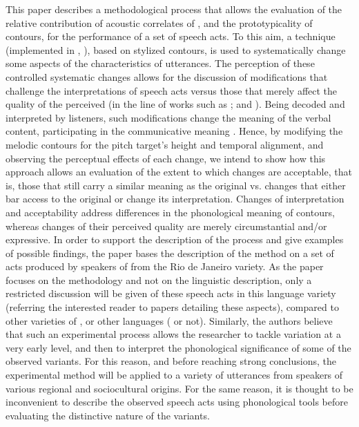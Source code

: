 \documentclass[output=paper]{LSP/langsci}
\begin{document}
This paper describes a methodological process that allows the evaluation of the relative contribution of acoustic correlates of , and the prototypicality of  contours, for the performance of a set of speech acts. 
To this aim, a  technique (implemented in , \citealt{Boersma.praat}), based on stylized contours, is used to systematically change some aspects of the  characteristics of utterances. 
The perception of these controlled systematic changes allows for the discussion of modifications that challenge the interpretations of speech acts versus those that merely affect the quality of the perceived  (in the line of works such as  \citealt{Uldall1960,fonagy1972}; and \citealt{house2005phrase}). 
Being decoded and interpreted by listeners, such  modifications change the meaning of the verbal content, participating in the communicative meaning \citep{Mahadin2011,nadeu2011pitch,portes2014dialogical,gonzalez2015gestural}. 
Hence, by modifying the melodic contours for the pitch target's height and temporal alignment, and observing the perceptual effects of each change, we intend to show how this approach allows an evaluation of the extent to which changes are acceptable, that is, those that still carry a similar meaning as the original vs. changes that either bar access to the original  or change its interpretation. 
Changes of interpretation and acceptability address differences in the phonological meaning of  contours, whereas changes of their perceived quality are merely circumstantial and/or expressive.
In order to support the description of the process and give examples of possible findings, the paper bases the description of the method on a set of  acts produced by speakers of  from the Rio de Janeiro variety.
As the paper focuses on the methodology and not on the linguistic description, only a restricted discussion will be given of these speech acts in this language variety (referring the interested reader to papers detailing these aspects), compared to other varieties of , or other languages ( or not).
Similarly, the authors believe that such an experimental process allows the researcher to tackle  variation at a very early level, and then to interpret the phonological significance of some of the observed variants.
For this reason, and before reaching strong conclusions, the experimental method will be applied to a variety of utterances from speakers of various regional and sociocultural origins.
For the same reason, it is thought to be inconvenient to describe the observed speech acts using phonological tools before evaluating the distinctive nature of the variants.
\end{document}
